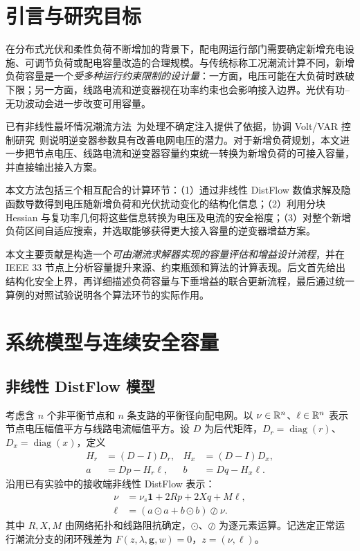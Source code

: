 \section{引言与研究目标}

在分布式光伏和柔性负荷不断增加的背景下，配电网运行部门需要确定新增充电设施、可调节负荷或配电容量改造的合理规模。与传统标称工况潮流计算不同，新增负荷容量是一个\emph{受多种运行约束限制的设计量}：一方面，电压可能在大负荷时跌破下限；另一方面，线路电流和逆变器视在功率约束也会影响接入边界。光伏有功--无功波动会进一步改变可用容量。

已有非线性最坏情况潮流方法~\cite{sou2026}为处理不确定注入提供了依据，协调 Volt/VAR 控制研究~\cite{pantazis2026}则说明逆变器参数具有改善电网电压的潜力。对于新增负荷规划，本文进一步把节点电压、线路电流和逆变器容量约束统一转换为新增负荷的可接入容量，并直接输出接入方案。

本文方法包括三个相互配合的计算环节：（1）通过非线性 DistFlow 数值求解及隐函数导数得到电压随新增负荷和光伏扰动变化的结构化信息；（2）利用分块 Hessian 与复功率几何将这些信息转换为电压及电流的安全裕度；（3）对整个新增负荷区间自适应搜索，并选取能够获得更大接入容量的逆变器增益方案。

本文主要贡献是构造一个\emph{可由潮流求解器实现的容量评估和增益设计流程}，并在 IEEE 33 节点上分析容量提升来源、约束瓶颈和算法的计算表现。后文首先给出结构化安全上界，再详细描述负荷容量与下垂增益的联合更新流程，最后通过统一算例的对照试验说明各个算法环节的实际作用。

\section{系统模型与连续安全容量}\label{sec:model}
\subsection{非线性 DistFlow 模型}

考虑含 $n$ 个非平衡节点和 $n$ 条支路的平衡径向配电网。以 $\nu\in\mathbb R^n$、$\ell\in\mathbb R^n$ 表示节点电压幅值平方与线路电流幅值平方。设 $D$ 为后代矩阵，$D_r=\operatorname{diag}(r)$、$D_x=\operatorname{diag}(x)$，定义
\begin{align}
H_r&=(D-I)D_r,&H_x&=(D-I)D_x,\\
a&=Dp-H_r\ell,&b&=Dq-H_x\ell .
\end{align}
沿用已有实验中的接收端非线性 DistFlow 表示：
\begin{align}
\nu&=\nu_s\mathbf1+2Rp+2Xq+M\ell,\label{eq:nu}\\
\ell&=(a\odot a+b\odot b)\oslash\nu.\label{eq:ell}
\end{align}
其中 $R,X,M$ 由网络拓扑和线路阻抗确定，$\odot$、$\oslash$ 为逐元素运算。记选定正常运行潮流分支的闭环残差为 $F(z,\lambda,\bm g,w)=0$，$z=(\nu,\ell)$。

